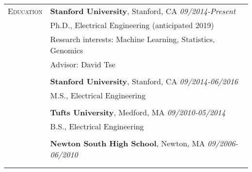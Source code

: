 \documentclass[letterpaper,11pt,oneside]{article}
\begin{document}
\noindent \begin{longtable}{@{} p{2.5cm} p{14.8cm}}
 \large{\textsc{Education}}    & \textbf{Stanford University}, Stanford, CA \hfill \textit{09/2014-Present} \\
     & Ph.D., Electrical Engineering (anticipated 2019) \\
     & Research interests: Machine Learning, Statistics, Genomics \\ 
     & Advisor: David Tse \\
     & \\
     & \textbf{Stanford University}, Stanford, CA \hfill \textit{09/2014-06/2016} \\
     & M.S., Electrical Engineering \\
     & \\
     & \textbf{Tufts University}, Medford, MA \hfill \textit{09/2010-05/2014} \\
     & B.S., Electrical Engineering \\
     & \\
     & \textbf{Newton South High School}, Newton, MA \hfill \textit{09/2006-06/2010} \\
     & \\
     & \\
  

\end{longtable}
\end{document}
